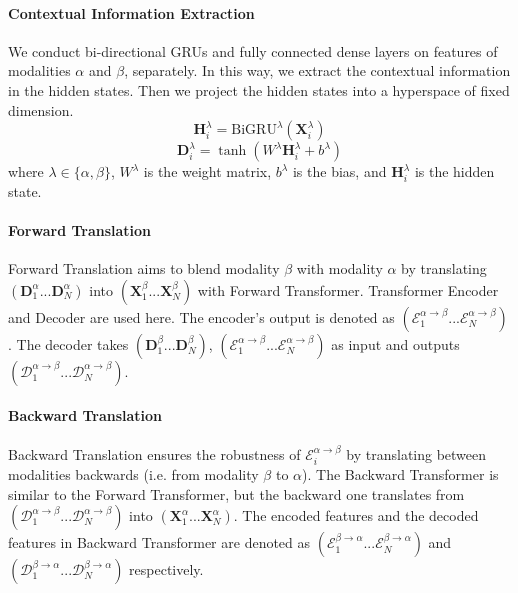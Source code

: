 \documentclass[sigconf]{acmart}
\begin{document}
	\paragraph{Contextual Information Extraction}
	We conduct bi-directional GRUs and fully connected dense layers on features of modalities $\alpha$ and $\beta$, separately. In this way, we extract the contextual information in the hidden states. Then we project the hidden states into a hyperspace of fixed dimension.
	\begin{equation}
		\mathbf{H}^{\lambda}_i = \mathrm{BiGRU}^{\lambda}(\mathbf{X}^{\lambda}_{i})
	\end{equation}
	\begin{equation}
		\mathbf{D}^{\lambda}_i = \tanh(W^{\lambda}\mathbf{H}^{\lambda}_i + b^{\lambda})
	\end{equation}
	where $\lambda \in \{\alpha, \beta\}$, $W^{\lambda}$ is the weight matrix, $b^{\lambda}$ is the bias, and $\mathbf{H}^{\lambda}_i$ is the hidden state. 
	
	\paragraph{Forward Translation}
	Forward Translation aims to blend modality $\beta$ with modality $\alpha$ by translating $(\mathbf{D}^{\alpha}_1...\mathbf{D}^{\alpha}_N)$ into $(\mathbf{X}^{\beta}_1...\mathbf{X}^{\beta}_N)$ with Forward Transformer. Transformer Encoder and Decoder are used here. The encoder's output is denoted as $(\mathcal{E}^{\alpha \to \beta}_1...\mathcal{E}^{\alpha \to \beta}_N)$. The decoder takes $(\mathbf{D}^{\beta}_1...\mathbf{D}^{\beta}_N)$, $(\mathcal{E}^{\alpha \to \beta}_1...\mathcal{E}^{\alpha \to \beta}_N)$ as input and outputs $(\mathcal{D}^{\alpha \to \beta}_1...\mathcal{D}^{\alpha \to \beta}_N)$.
	
	\paragraph{Backward Translation}
	Backward Translation ensures the robustness of $\mathcal{E}^{\alpha \to \beta}_i$ by translating between modalities backwards (i.e. from modality $\beta$ to $\alpha$). The Backward Transformer is similar to the Forward Transformer, but the backward one translates from $(\mathcal{D}^{\alpha \to \beta}_1...\mathcal{D}^{\alpha \to \beta}_N)$ into $(\mathbf{X}^{\alpha}_1...\mathbf{X}^{\alpha}_N)$. The encoded features and the decoded features in Backward Transformer are denoted as $(\mathcal{E}^{\beta \to \alpha}_1...\mathcal{E}^{\beta \to \alpha}_N)$ and $(\mathcal{D}^{\beta \to \alpha}_1...\mathcal{D}^{\beta \to \alpha}_N)$ respectively.
\end{document}
